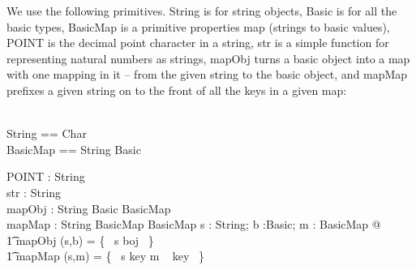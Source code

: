 \documentclass[a4paper,twoside,12pt]{article}
\begin{document}
We use the following primitives. String is for string objects, Basic is for all the basic types, BasicMap is a primitive properties map (strings to basic values), POINT is the decimal point character in a string, str is a simple function for representing natural numbers as strings, mapObj turns a basic object into a map with one mapping in it -- from the given string to the basic object, and mapMap prefixes a given string on to the front of all the keys in a given map:
\begin{zed}
	[Char, Basic]	\\
	String == \seq Char	\\
	BasicMap == String \pfun Basic
\end{zed}
\begin{axdef}
	POINT : String	\\
	str : \nat \fun String	\\
	mapObj : String \cross Basic \fun BasicMap	\\
	mapMap : String \cross BasicMap \fun BasicMap
\where
	\forall s : String; b :Basic; m : BasicMap @	\\
	\t1 mapObj (s,b) = \{~ s \mapsto boj ~\} \land	\\
	\t1 mapMap (s,m) = \{~ s \cat key \mapsto m ~ key ~\}
\end{axdef}
\end{document}
